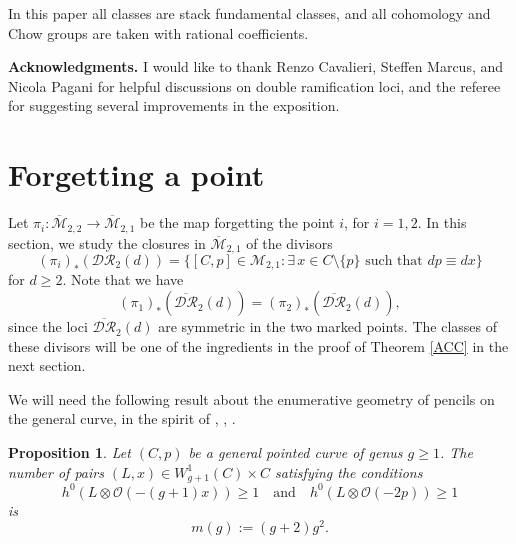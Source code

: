 \documentclass[10pt]{amsart}
\newtheorem{prop}{Proposition}[section]
\theoremstyle{definition}
\begin{document}
In this paper all classes are stack fundamental classes, and all cohomology and Chow groups are taken with rational coefficients.

{\bf Acknowledgments.}
I would like to thank Renzo Cavalieri, Steffen Marcus, and Nicola Pagani for helpful discussions on double ramification loci, and the referee for suggesting several improvements in the exposition.

\section{Forgetting a point}
\label{div}

Let $\pi_i\colon {\overline{\mathcal{M}}}_{2,2}\rightarrow {\overline{\mathcal{M}}}_{2,1}$ be the map forgetting the point $i$, for $i=1,2$. In this section, we study the closures in ${\overline{\mathcal{M}}}_{2,1}$ of the divisors
\[
 (\pi_i)_*\left({\mathcal{DR}}_2(d)\right)=\{[C,p]\in{\mathcal{M}}_{2,1} : \exists \, x\in C\setminus\{p\} \,\, \mbox{such that}\,\, dp\equiv dx\}
\]
for $d\geq 2$. Note that we have
\[
 (\pi_1)_*\left(\overline{\mathcal{DR}}_2(d)\right)=(\pi_2)_*\left(\overline{\mathcal{DR}}_2(d)\right),
\]
since the loci $\overline{\mathcal{DR}}_2(d)$ are symmetric in the two marked points. The classes of these divisors will be one of the ingredients in the proof of Theorem \ref{ACC} in the next section.

We will need the following result about the enumerative geometry of pencils on the general curve, in the spirit of \cite[Theorem A,B]{MR664324}, \cite[\S 2]{MR735335}, \cite[\S 2.1]{MR2574363}.

\begin{prop}
\label{m}
 Let $(C,p)$ be a general pointed curve of genus $g\geq 1$. The number of pairs $(L,x)\in W^1_{g+1}(C)\times C$ satisfying the conditions 
\[
 h^0(L\otimes \mathcal{O}(-(g+1)x))\geq 1 \quad \textrm{and} \quad h^0(L\otimes \mathcal{O}(-2p))\geq 1 
\]
is
\[
 m(g):=(g+2)g^2.
\]
\end{prop}
\end{document}

